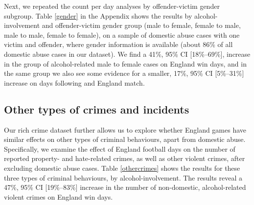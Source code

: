 \documentclass[12pt, a4paper]{article}
\begin{document}
 Next, we repeated the count per day analyses by offender-victim gender subgroup. Table \ref{gender} in the Appendix shows the results by alcohol-involvement and offender-victim gender group (male to female, female to male, male to male, female to female), on a sample of domestic abuse cases with one victim and offender, where gender information is available (about 86\% of all domestic abuse cases in our dataset). We find a 41\%, 95\% CI [18\%--69\%], increase in the group of alcohol-related male to female cases on England win days, and in the same group we also see some evidence for a smaller, 17\%, 95\% CI [5\%--31\%] increase on days following and England match.



\subsection{Other types of crimes and incidents}


Our rich crime dataset further allows us to explore whether England games have similar effects on other types of criminal behaviours, apart from domestic abuse. Specifically, we examine the effect of England football days on the number of reported property- and hate-related crimes, as well as other violent crimes, after excluding domestic abuse cases. Table \ref{othercrimes} shows the results for these three types of criminal behaviours, by alcohol-involvement. The results reveal a 47\%, 95\% CI [19\%--83\%] increase in the number of non-domestic, alcohol-related violent crimes on England win days.
\end{document}
